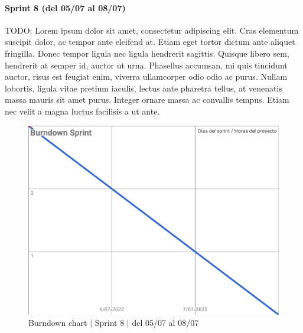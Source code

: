\paragraph{Sprint 8 (del 05/07 al 08/07)}
TODO: Lorem ipsum dolor sit amet, consectetur adipiscing elit. Cras elementum suscipit dolor, ac tempor ante eleifend at. Etiam eget tortor dictum ante aliquet fringilla. Donec tempor ligula nec ligula hendrerit sagittis. Quisque libero sem, hendrerit at semper id, auctor ut urna. Phasellus accumsan, mi quis tincidunt auctor, risus est feugiat enim, viverra ullamcorper odio odio ac purus. Nullam lobortis, ligula vitae pretium iaculis, lectus ante pharetra tellus, at venenatis massa mauris sit amet purus. Integer ornare massa ac convallis tempus. Etiam nec velit a magna luctus facilisis a ut ante.
\begin{figure}[H]
    \centering
    \includegraphics[width=1\linewidth]{text/image/BurndownChart8.pdf}
    \caption{Burndown chart $|$ Sprint 8 $|$ del 05/07 al 08/07}
    \label{fig:burndown_chart_8}
\end{figure}